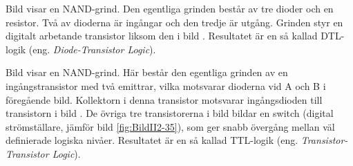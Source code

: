 
Bild  visar en NAND-grind.
Den egentliga grinden består av tre dioder och en resistor.
Två av dioderna är ingångar och den tredje är utgång.
Grinden styr en digitalt arbetande transistor liksom den i bild
.
Resultatet är en så kallad DTL-logik (eng. \emph{Diode-Transistor Logic}).


Bild  visar en NAND-grind.
Här består den egentliga grinden av en ingångstransistor med två emittrar,
vilka motsvarar dioderna vid A och B i föregående bild.
Kollektorn i denna transistor motsvarar ingångsdioden till transistorn i bild
.
De övriga tre transistorerna i bild  bildar en switch
(digital strömställare, jämför bild \ref{fig:BildII2-35}), som ger snabb
övergång mellan väl definierade logiska nivåer.
Resultatet är en så kallad TTL-logik (eng. \emph{Transistor-Transistor Logic}).
